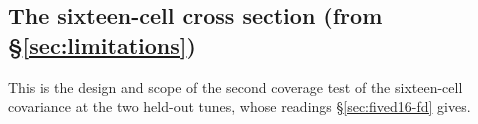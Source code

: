 
\subsection{The sixteen-cell cross section (from \S\ref{sec:limitations})}\label{rlim:fived16}
This is the design and scope of the second coverage test of the sixteen-cell covariance at the two held-out tunes, whose readings \S\ref{sec:fived16-fd} gives.

